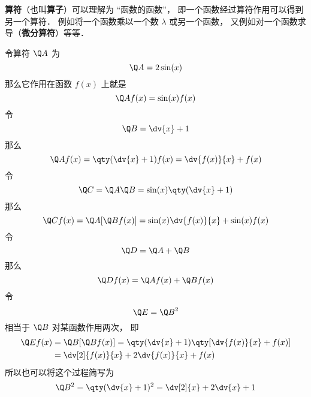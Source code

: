 

\textbf{算符}（也叫\textbf{算子}）可以理解为 “函数的函数”， 即一个函数经过算符作用可以得到另一个算符． 例如将一个函数乘以一个数 $\lambda$ 或另一个函数， 又例如对一个函数求导（\textbf{微分算符}）等等．

\begin{example}{}
令算符 $\Q A$ 为
\begin{equation}
\Q A = 2\sin(x)
\end{equation}
那么它作用在函数 $f(x)$ 上就是
\begin{equation}
\Q A f(x) = \sin(x) f(x)
\end{equation}
令
\begin{equation}
\Q B = \dv{x} + 1
\end{equation}
那么
\begin{equation}
\Q A f(x) = \qty(\dv{x} + 1)f(x) = \dv{f(x)}{x} + f(x)
\end{equation}
令
\begin{equation}
\Q C = \Q A \Q B = \sin(x) \qty(\dv{x} + 1)
\end{equation}
那么
\begin{equation}
\Q C f(x) = \Q A [\Q B f(x)] = \sin(x)\dv{f(x)}{x} + \sin(x)f(x)
\end{equation}
令
\begin{equation}
\Q D = \Q A + \Q B
\end{equation}
那么
\begin{equation}
\Q D f(x) = \Q A f(x) + \Q B f(x)
\end{equation}
令
\begin{equation}
\Q E = {\Q B}^2
\end{equation}
相当于 $\Q B$ 对某函数作用两次， 即
\begin{equation}
\begin{aligned}
\Q E f(x) &= \Q B [\Q B f(x)] = \qty(\dv{x} + 1)\qty[\dv{f(x)}{x} + f(x)] \\
&= \dv[2]{f(x)}{x} + 2\dv{f(x)}{x} + f(x)
\end{aligned}
\end{equation}
所以也可以将这个过程简写为
\begin{equation}
\Q B^2 = \qty(\dv{x} + 1)^2 = \dv[2]{x} + 2\dv{x} + 1
\end{equation}
\end{example}
